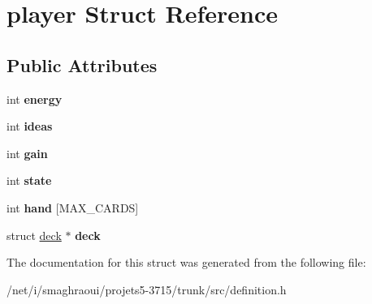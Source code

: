 \hypertarget{structplayer}{\section{player Struct Reference}
\label{structplayer}
}
\subsection*{Public Attributes}
\begin{DoxyCompactItemize}
\item 
\hypertarget{structplayer_a70c9c5a133fa185ba006a87b9dffc18f}{int {\bfseries energy}}\label{structplayer_a70c9c5a133fa185ba006a87b9dffc18f}

\item 
\hypertarget{structplayer_ab19fdbee09d6835d91acfd0ea8848bbb}{int {\bfseries ideas}}\label{structplayer_ab19fdbee09d6835d91acfd0ea8848bbb}

\item 
\hypertarget{structplayer_a4d67faaf5ae4140f61ead2fd5a58717e}{int {\bfseries gain}}\label{structplayer_a4d67faaf5ae4140f61ead2fd5a58717e}

\item 
\hypertarget{structplayer_a3f6fe29f707730c1a07e9a631f68c983}{int {\bfseries state}}\label{structplayer_a3f6fe29f707730c1a07e9a631f68c983}

\item 
\hypertarget{structplayer_aec1971ae7f14e2f7238a3c889faa4598}{int {\bfseries hand} \mbox{[}M\-A\-X\-\_\-\-C\-A\-R\-D\-S\mbox{]}}\label{structplayer_aec1971ae7f14e2f7238a3c889faa4598}

\item 
\hypertarget{structplayer_a580b90e0a0f30ffe1ca7f0f48dd6cb2b}{struct \hyperlink{structdeck}{deck} $\ast$ {\bfseries deck}}\label{structplayer_a580b90e0a0f30ffe1ca7f0f48dd6cb2b}

\end{DoxyCompactItemize}


The documentation for this struct was generated from the following file\-:\begin{DoxyCompactItemize}
\item 
/net/i/smaghraoui/projets5-\/3715/trunk/src/definition.\-h\end{DoxyCompactItemize}
